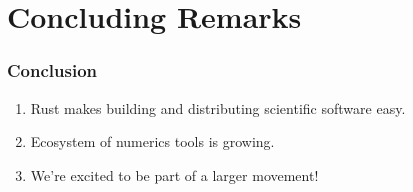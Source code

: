 \section{Concluding Remarks}

\begin{frame}
    \frametitle{Conclusion}

    \begin{enumerate}
        \item Rust makes building and distributing scientific software easy.
        \item Ecosystem of numerics tools is growing.
        \item We're excited to be part of a larger movement!
    \end{enumerate}
\end{frame}